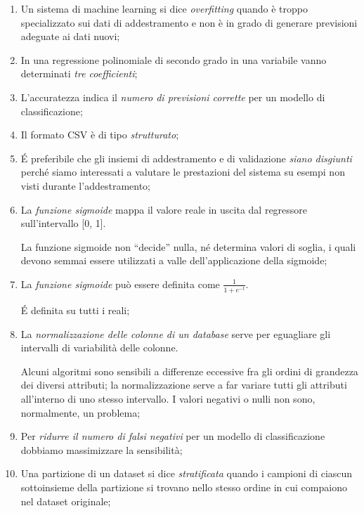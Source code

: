 \begin{enumerate}

	\item Un sistema di machine learning si dice \emph{overfitting} quando è troppo specializzato sui dati di addestramento e non è in grado di generare previsioni adeguate ai dati nuovi;

	\item In una regressione polinomiale di secondo grado in una variabile vanno determinati \emph{tre coefficienti};

	\item L’accuratezza indica il \emph{numero di previsioni corrette} per un modello di classificazione;

	\item Il formato CSV è di tipo \emph{strutturato};

	\item \'E preferibile che gli insiemi di addestramento e di validazione \emph{siano disgiunti} perché siamo interessati a valutare le prestazioni del sistema su esempi non visti durante l’addestramento;

	\item La \emph{funzione sigmoide} mappa il valore reale in uscita dal regressore sull’intervallo [0, 1].

	La funzione sigmoide non “decide” nulla, né determina valori di soglia, i quali devono semmai essere utilizzati a valle dell’applicazione della sigmoide;

	\item La \emph{funzione sigmoide} può essere definita come \( \frac{1}{1 + e^{−t}} \).

	\'E definita su tutti i reali;

	\item La \emph{normalizzazione delle colonne di un database} serve per eguagliare gli intervalli di variabilità delle colonne.

	Alcuni algoritmi sono sensibili a differenze eccessive fra gli ordini di grandezza dei diversi attributi; la normalizzazione serve a far variare tutti gli attributi all’interno di uno stesso intervallo. I valori negativi o nulli non sono, normalmente, un problema;

	\item Per \emph{ridurre il numero di falsi negativi} per un modello di classificazione dobbiamo massimizzare la sensibilità;

	\item Una partizione di un dataset si dice \emph{stratificata} quando i campioni di ciascun sottoinsieme della partizione si trovano nello stesso ordine in cui compaiono nel dataset originale;


\end{enumerate}
